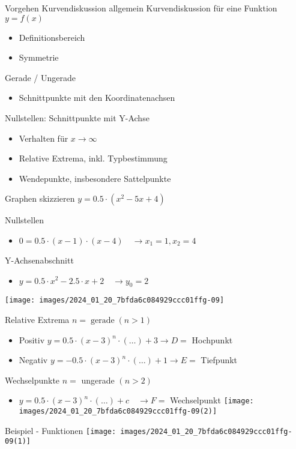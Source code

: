 \begin{KR}{Vorgehen Kurvendiskussion allgemein}
Kurvendiskussion für eine Funktion $y=f(x)$

\begin{itemize}
  \item Definitionsbereich
  \item Symmetrie
\end{itemize}

Gerade / Ungerade

\begin{itemize}
  \item Schnittpunkte mit den Koordinatenachsen
\end{itemize}

Nullstellen: Schnittpunkte mit Y-Achse

\begin{itemize}
  \item Verhalten für $x \rightarrow \infty$
  \item Relative Extrema, inkl. Typbestimmung
  \item Wendepunkte, insbesondere Sattelpunkte
\end{itemize}
\end{KR}

\begin{concept}{Graphen skizzieren}
$y=0.5 \cdot\left(x^{2}-5 x+4\right)$

Nullstellen

\begin{itemize}
  \item $0=0.5 \cdot(x-1) \cdot(x-4) \quad \rightarrow x_{1}=1, x_{2}=4$
\end{itemize}

Y-Achsenabschnitt

\begin{itemize}
  \item $y=0.5 \cdot x^{2}-2.5 \cdot x+2 \quad \rightarrow y_{0}=2$
\end{itemize}

\begin{center}
\texttt{[image: images/2024\_01\_20\_7bfda6c084929ccc01ffg-09]}
\end{center}

Relative Extrema $n=\operatorname{gerade}(n>1)$

\begin{itemize}
  \item Positiv $y=0.5 \cdot(x-3)^{n} \cdot(\ldots)+3 \rightarrow D=$ Hochpunkt
  \item Negativ $y=-0.5 \cdot(x-3)^{n} \cdot(\ldots)+1 \rightarrow E=$ Tiefpunkt
\end{itemize}

Wechselpunkte $n=$ ungerade $(n>2)$

\begin{itemize}
  \item $y=0.5 \cdot(x-3)^{n} \cdot(\ldots)+c \quad \rightarrow F=$ Wechselpunkt
\texttt{[image: images/2024\_01\_20\_7bfda6c084929ccc01ffg-09(2)]}
\end{itemize}


    
\end{concept}

Beispiel - Funktionen
\texttt{[image: images/2024\_01\_20\_7bfda6c084929ccc01ffg-09(1)]}